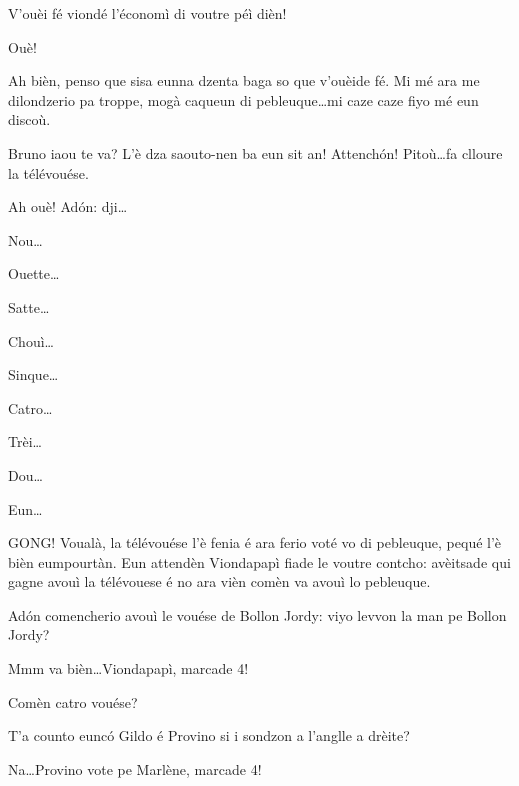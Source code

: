 \begin{drama}
\Brunospeaks V'ouèi fé viondé l'économì di voutre péì dièn!

\Jordyspeaks Ouè!

\Brunospeaks Ah bièn, penso que sisa eunna dzenta baga so que v'ouèide fé.  Mi mé ara me dilondzerio pa troppe, mogà caqueun di pebleuque\ldots mi caze caze fiyo mé eun discoù.


\Noteospeaks Bruno iaou te va? L'è dza saouto-nen ba eun sit an! Attench\'on! Pitoù\ldots fa clloure la télévouése.

\Brunospeaks Ah ouè! Ad\'on: dji\ldots

\Noteospeaks Nou\ldots

\Brunospeaks Ouette\ldots

\Noteospeaks Satte\ldots

\Brunospeaks Chouì\ldots

\Noteospeaks Sinque\ldots

\Brunospeaks Catro\ldots

\Noteospeaks Trèi\ldots

\Brunospeaks Dou\ldots

\Noteospeaks Eun\ldots


\Brunospeaks GONG! Voualà, la télévouése l'è fenia é ara ferio voté vo di pebleuque, pequé l'è bièn eumpourtàn. Eun attendèn Viondapapì fiade le voutre contcho: avèitsade qui gagne avouì la télévouese é no ara vièn comèn va avouì lo pebleuque.


\Brunospeaks {} Ad\'on comencherio avouì le vouése de Bollon Jordy: viyo levvon la man pe Bollon Jordy?


\Brunospeaks Mmm va bièn\ldots Viondapapì, marcade 4!

\Jordyspeaks Comèn catro vouése?

\Noteospeaks {} T'a counto eunc\'o Gildo é Provino si i sondzon a l'anglle a drèite?

\Brunospeaks Na\ldots Provino vote pe Marlène, marcade 4!


\end{drama}
